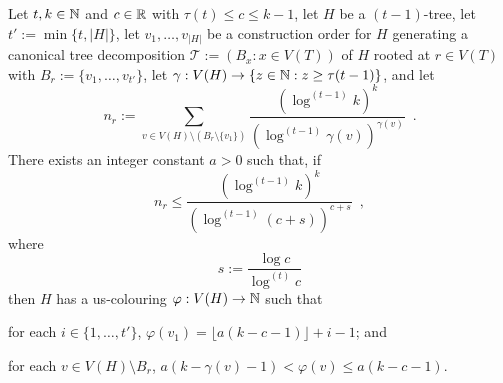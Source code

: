 \documentclass[kpfonts]{patmorin}
\theoremstyle{named}
\begin{document}
\begin{lem}\label{t-tree-slack}
Let $t,k\in\mathbb{N}$ and $c\in\mathbb{R}$  with $\tau(t)\le c\le k-1$, let $H$ be a $(t-1)$-tree, let $t':=\min\{t, |H|\}$, let $v_1,\ldots,v_{|H|}$ be a construction order for $H$ generating a canonical tree decomposition $\mathcal{T}:=(B_x:x\in V(T))$ of $H$ rooted at $r\in V(T)$ with $B_r:=\{v_1,\ldots,v_{t'}\}$, let $\gamma:V(H)\to\{z\in\mathbb{N}: z\ge \tau(t-1)\}$, and let
\[
    n_r:=\sum_{v\in V(H)\setminus (B_r\setminus\{v_1\})} \frac{(\log^{(t-1)} k)^k}{(\log^{(t-1)} \gamma(v))^{\gamma(v)}} \enspace .
\]
There exists an integer constant $a>0$ such that,
if
\begin{equation}
     n_r \le \frac{(\log^{(t-1)} k)^k}{\left(\log^{(t-1)} (c + s)\right)^{c+s}} \enspace ,
 \label{total-weight-i}
\end{equation}
where
\[
    s := \frac{\log c}{\log^{(t)} c}
\]
then $H$ has a us-colouring $\varphi:V(H)\to\mathbb{N}$ such that
\begin{compactenum}[(P1)]
    \item for each $i\in\{1,\ldots,{t'}\}$, $\varphi(v_1)=\lfloor a(k-c-1)\rfloor+i-1$; and
    \item for each $v\in V(H)\setminus B_r$, $a(k-\gamma(v)-1) < \varphi(v) \le a(k-c-1)$.
\end{compactenum}
\end{lem}
\end{document}
